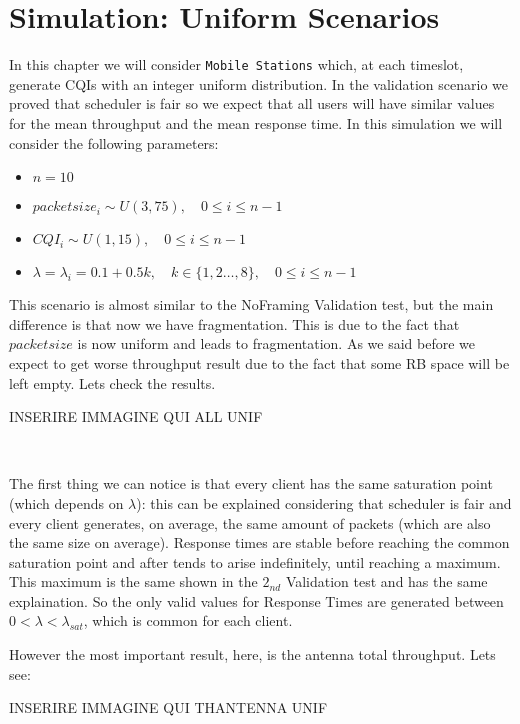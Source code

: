 \chapter{Simulation: Uniform Scenarios}
In this chapter we will consider \texttt{Mobile Stations} which, at each timeslot, generate CQIs with an integer uniform distribution. In the validation scenario we proved that scheduler is fair so we expect that all users will have similar values for the mean throughput and the mean response time. In this simulation we will consider the following parameters:
\begin{itemize}
	\item \(n=10\)
	\item \(packetsize_{i} \sim U(3,75), \quad 0 \le i \le n-1\)
	\item \(CQI_{i} \sim U(1,15), \quad 0 \le i \le n-1\)
	\item \( \lambda = \lambda_{i} = 0.1 + 0.5k, \quad k\in\{1,2\ldots,8\}, \quad 0 \le i \le n-1\)
\end{itemize}
This scenario is almost similar to the NoFraming Validation test, but the main difference is that now we have fragmentation. This is due to the fact that \(packetsize\) is now uniform and leads to fragmentation. As we said before we expect to get worse throughput result due to the fact that some RB space will be left empty. Lets check the results.

\begin{center}
	INSERIRE IMMAGINE QUI ALL UNIF
\end{center}
\

The first thing we can notice is that every client has the same saturation point (which depends on \(\lambda\)): this can be explained considering that scheduler is fair and every client generates, on average, the same amount of packets (which are also the same size on average). Response times are stable before reaching the common saturation point and after tends to arise indefinitely, until reaching a maximum. This maximum is the same shown in the \(2_{nd}\) Validation test and has the same explaination. So the only valid values for Response Times are generated between \(0 < \lambda < \lambda_{sat}\), which is common for each client.

However the most important result, here, is the antenna total throughput. Lets see:

\begin{center}
	INSERIRE IMMAGINE QUI THANTENNA	UNIF
\end{center}
\

